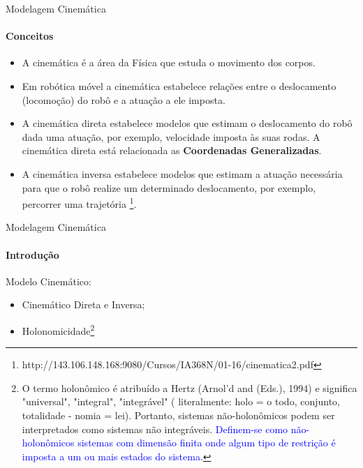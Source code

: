 \documentclass[aspectratio=169]{beamer}
\begin{document}
\begin{frame}{Modelagem Cinemática}
    \framesubtitle{Conceitos}
    \begin{itemize}
        \item A cinemática é a área da Física que estuda o movimento dos corpos.
        \item Em robótica móvel a cinemática estabelece relações entre o deslocamento (locomoção) do robô e a atuação a ele imposta.
        \item A cinemática direta estabelece modelos que estimam o deslocamento do robô dada uma atuação, por exemplo, velocidade imposta às suas rodas. A cinemática direta está relacionada as \textbf{Coordenadas Generalizadas}.
        \item A cinemática inversa estabelece modelos que estimam a atuação necessária para que o robô realize um determinado deslocamento, por exemplo, percorrer uma trajetória \footnote{http://143.106.148.168:9080/Cursos/IA368N/01-16/cinematica2.pdf}.
    \end{itemize}
\end{frame}


\begin{frame}{Modelagem Cinemática}
    \framesubtitle{Introdução}
    Modelo Cinemático:
            \begin{itemize}
                \item Cinemático Direta e Inversa;
                \item Holonomicidade\footnote{O termo holonômico é atribuído a Hertz (Arnol'd and (Eds.), 1994) e significa "universal", "integral", "integrável" ( literalmente: holo = o todo, conjunto, totalidade - nomia = lei). Portanto, sistemas não-holonômicos podem ser interpretados como sistemas não integráveis. \textcolor{blue}{Definem-se como não-holonômicos sistemas com dimensão finita onde algum tipo de restrição é imposta a um ou mais estados do sistema.}}
            \end{itemize}

\end{frame}
\end{document}
